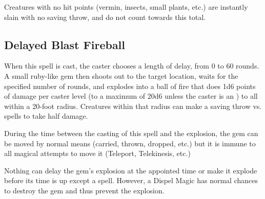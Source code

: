 \begin{multicols*}{2}

Creatures with no hit points (vermin, insects, small plants, etc.) are instantly slain with no saving throw, and do not count towards this total.

\subsection{Delayed Blast Fireball}\label{spell:Delayed Blast Fireball}

When this spell is cast, the caster chooses a length of delay, from 0 to 60 rounds. A small ruby-like gem then shoots out to the target location, waits for the specified number of rounds, and explodes into a ball of fire that does 1d6 points of damage per caster level (to a maximum of 20d6 unless the caster is an ) to all within a 20-foot radius. Creatures within that radius can make a saving throw vs. spells to take half damage.

During the time between the casting of this spell and the explosion, the gem can be moved by normal means (carried, thrown, dropped, etc.) but it is immune to all magical attempts to move it (Teleport, Telekinesis, etc.)

Nothing can delay the gem’s explosion at the appointed time or make it explode before its time is up except a  spell. However, a Dispel Magic has normal chances to destroy the gem and thus prevent the explosion.


\end{multicols*}

